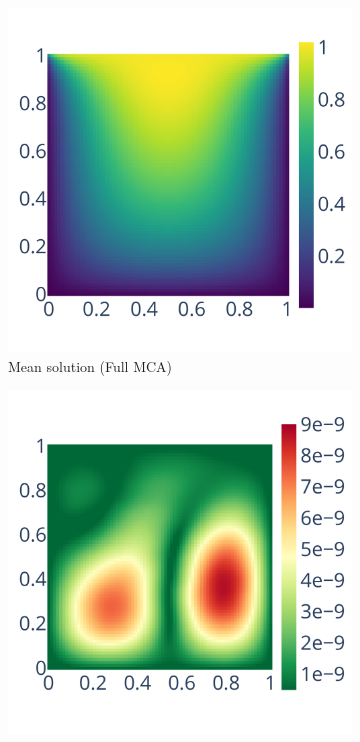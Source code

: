 \begin{figure}
    \begin{subfigure}{0.45\linewidth}
        \includegraphics[width=\linewidth]{figure/root_finding/solution_mean_MCA.pdf}
        \caption{Mean solution (Full MCA)}
        \label{fig:mean_solution_mca}
    \end{subfigure}
    \begin{subfigure}{0.45\linewidth}
        \includegraphics[width=\linewidth]{figure/root_finding/solution_std_MCA.pdf}

\end{subfigure}
\end{figure}
